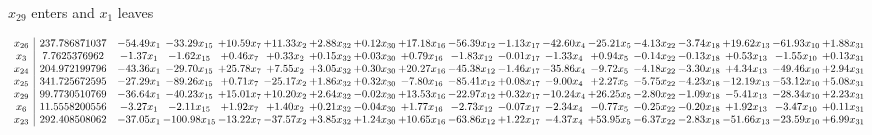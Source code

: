 \documentclass[9pt]{article}
\begin{document}
 $ x_{29} $ enters and $ x_{1} $ leaves 

 \[\begin{array}{c| c c@{\hskip 2pt} c@{\hskip 2pt} c@{\hskip 2pt} c@{\hskip 2pt} c@{\hskip 2pt} c@{\hskip 2pt} c@{\hskip 2pt} c@{\hskip 2pt} c@{\hskip 2pt} c@{\hskip 2pt} c@{\hskip 2pt} c@{\hskip 2pt} c@{\hskip 2pt} c@{\hskip 2pt} c@{\hskip 2pt} c@{\hskip 2pt} }
 x_{26}   &  237.786871037 & -54.49 x_{1} & -33.29 x_{15} & + 10.59 x_{7} & + 11.33 x_{2} & +  2.88 x_{32} & +  0.12 x_{30} & + 17.18 x_{16} & -56.39 x_{12} & -1.13 x_{17} & -42.60 x_{4} & -25.21 x_{5} & -4.13 x_{22} & -3.74 x_{18} & + 19.62 x_{13} & -61.93 x_{10} & +  1.88 x_{31}\\
 x_{3}   &  7.7625376962 & -1.37 x_{1} & -1.62 x_{15} & +  0.46 x_{7} & +  0.33 x_{2} & +  0.15 x_{32} & +  0.03 x_{30} & +  0.79 x_{16} & -1.83 x_{12} & -0.01 x_{17} & -1.33 x_{4} & +  0.94 x_{5} & -0.14 x_{22} & -0.13 x_{18} & +  0.53 x_{13} & -1.55 x_{10} & +  0.13 x_{31}\\
 x_{24}   &  204.972199796 & -43.36 x_{1} & -29.70 x_{15} & + 25.78 x_{7} & +  7.55 x_{2} & +  3.05 x_{32} & +  0.30 x_{30} & + 20.27 x_{16} & -45.38 x_{12} & -1.46 x_{17} & -35.86 x_{4} & -9.72 x_{5} & -4.18 x_{22} & -3.30 x_{18} & +  4.34 x_{13} & -49.46 x_{10} & +  2.94 x_{31}\\
 x_{25}   &  341.725672595 & -27.29 x_{1} & -89.26 x_{15} & +  0.71 x_{7} & -25.17 x_{2} & +  1.86 x_{32} & +  0.32 x_{30} & -7.80 x_{16} & -85.41 x_{12} & +  0.08 x_{17} & -9.00 x_{4} & +  2.27 x_{5} & -5.75 x_{22} & -4.23 x_{18} & -12.19 x_{13} & -53.12 x_{10} & +  5.08 x_{31}\\
 x_{29}   &  99.7730510769 & -36.64 x_{1} & -40.23 x_{15} & + 15.01 x_{7} & + 10.20 x_{2} & +  2.64 x_{32} & -0.02 x_{30} & + 13.53 x_{16} & -22.97 x_{12} & +  0.32 x_{17} & -10.24 x_{4} & + 26.25 x_{5} & -2.80 x_{22} & -1.09 x_{18} & -5.41 x_{13} & -28.34 x_{10} & +  2.23 x_{31}\\
 x_{6}   &  11.5558200556 & -3.27 x_{1} & -2.11 x_{15} & +  1.92 x_{7} & +  1.40 x_{2} & +  0.21 x_{32} & -0.04 x_{30} & +  1.77 x_{16} & -2.73 x_{12} & -0.07 x_{17} & -2.34 x_{4} & -0.77 x_{5} & -0.25 x_{22} & -0.20 x_{18} & +  1.92 x_{13} & -3.47 x_{10} & +  0.11 x_{31}\\
 x_{23}   &  292.408508062 & -37.05 x_{1} & -100.98 x_{15} & -13.22 x_{7} & -37.57 x_{2} & +  3.85 x_{32} & +  1.24 x_{30} & + 10.65 x_{16} & -63.86 x_{12} & +  1.22 x_{17} & -4.37 x_{4} & + 53.95 x_{5} & -6.37 x_{22} & -2.83 x_{18} & -51.66 x_{13} & -23.59 x_{10} & +  6.99 x_{31}\\

\end{array}\]
\end{document}
